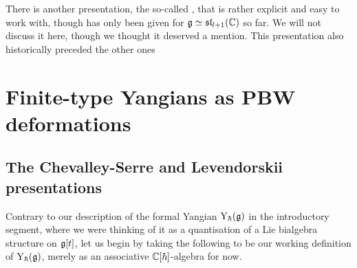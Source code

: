         There is another presentation, the so-called , that is rather explicit and easy to work with, though has only been given for $\mathfrak{g} \simeq \mathfrak{sl}_{l + 1}(\mathbb{C})$ so far. We will not discuss it here, though we thought it deserved a mention. This presentation also historically preceded the other ones

    \section{Finite-type Yangians as PBW deformations}
        \subsection{The Chevalley-Serre and Levendorskii presentations}
            Contrary to our description of the formal Yangian $\mathrm{Y}_{\hbar}(\mathfrak{g})$ in the introductory segment, where we were thinking of it as a quantisation of a Lie bialgebra structure on $\mathfrak{g}[t]$, let us begin by taking the following to be our working definition of $\mathrm{Y}_{\hbar}(\mathfrak{g})$, merely as an associative $\mathbb{C}[\hbar]$-algebra for now.

